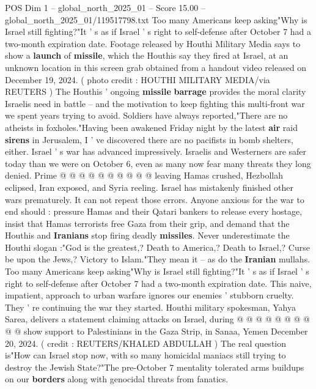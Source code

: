\begin{textsample}{POS Dim 1 – global\_north\_2025\_01 – Score 15.00 – global\_north\_2025\_01/119517798.txt}  \label{ex:f1_pos_397}
Too many Americans keep asking"Why is Israel still fighting?"It ' s as if Israel ' s right to self-defense after October 7 had a two-month expiration date.
Footage released by Houthi Military Media says to show a \textbf{launch} of \textbf{missile}, which the Houthis say they fired at Israel, at an unknown location in this screen grab obtained from a handout video released on December 19, 2024. ( photo credit : HOUTHI MILITARY MEDIA/via REUTERS ) The Houthis ' ongoing \textbf{missile} \textbf{barrage} provides the moral clarity Israelis need in battle -- and the motivation to keep fighting this multi-front war we spent years trying to avoid.
Soldiers have always reported,"There are no atheists in foxholes."Having been awakened Friday night by the latest \textbf{air} raid \textbf{sirens} in Jerusalem, I ' ve discovered there are no pacifists in bomb shelters, either.
Israel ' s war has advanced impressively.
Israelis and Westerners are safer today than we were on October 6, even as many now fear many threats they long denied.
Prime @ @ @ @ @ @ @ @ @ @ leaving Hamas crushed, Hezbollah eclipsed, Iran exposed, and Syria reeling.
Israel has mistakenly finished other wars prematurely.
It can not repeat those errors.
Anyone anxious for the war to end should : pressure Hamas and their Qatari bankers to release every hostage, insist that Hamas terrorists free Gaza from their grip, and demand that the Houthis and \textbf{Iranians} stop firing deadly \textbf{missiles}.
Never underestimate the Houthi slogan :"God is the greatest,?
Death to America,?
Death to Israel,?
Curse be upon the Jews,?
Victory to Islam."They mean it -- as do the \textbf{Iranian} mullahs.
Too many Americans keep asking"Why is Israel still fighting?"It ' s as if Israel ' s right to self-defense after October 7 had a two-month expiration date.
This naive, impatient, approach to urban warfare ignores our enemies ' stubborn cruelty.
They ' re continuing the war they started.
Houthi military spokesman, Yahya Sarea, delivers a statement claiming attacks on Israel, during @ @ @ @ @ @ @ @ @ @ show support to Palestinians in the Gaza Strip, in Sanaa, Yemen December 20, 2024. ( credit : REUTERS/KHALED ABDULLAH ) The real question is"How can Israel stop now, with so many homicidal maniacs still trying to destroy the Jewish State?"The pre-October 7 mentality tolerated arms buildups on our \textbf{borders} along with genocidal threats from fanatics.

\end{textsample}
